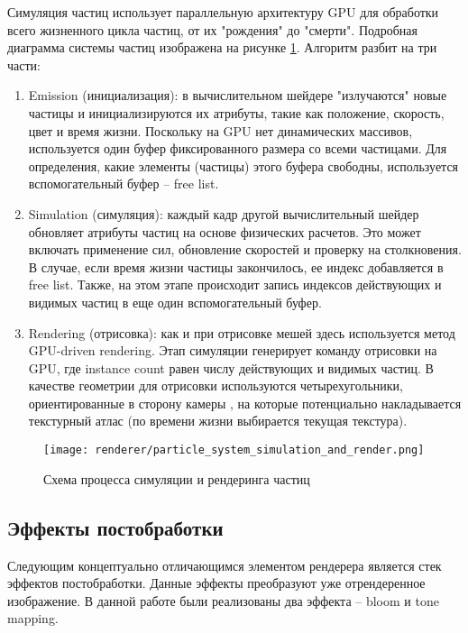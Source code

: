 Симуляция частиц использует параллельную архитектуру GPU для обработки всего жизненного цикла частиц, от их "рождения" до "смерти". Подробная диаграмма системы частиц изображена на рисунке \ref{fig:particle_system_simulation_and_render}. Алгоритм разбит на три части:
\begin{enumerate}
    \item Emission (инициализация): в вычислительном шейдере "излучаются" новые частицы и инициализируются их атрибуты, такие как положение, скорость, цвет и время жизни. Поскольку на GPU нет динамических массивов, используется один буфер фиксированного размера со всеми частицами. Для определения, какие элементы (частицы) этого буфера свободны, используется вспомогательный буфер -- free list.
    \item Simulation (симуляция): каждый кадр другой вычислительный шейдер обновляет атрибуты частиц на основе физических расчетов. Это может включать применение сил, обновление скоростей и проверку на столкновения. В случае, если время жизни частицы закончилось, ее индекс добавляется в free list. Также, на этом этапе происходит запись индексов действующих и видимых частиц в еще один вспомогательный буфер.
    \item Rendering (отрисовка): как и при отрисовке мешей здесь используется метод GPU-driven rendering. Этап симуляции генерирует команду отрисовки на GPU, где instance count равен числу действующих и видимых частиц. В качестве геометрии для отрисовки используются четырехугольники, ориентированные в сторону камеры \cite{schaufler1995dynamically}, на которые потенциально накладывается текстурный атлас (по времени жизни выбирается текущая текстура).
\end{enumerate}

\begin{figure}[h]
    \centering
    \texttt{[image: renderer/particle\_system\_simulation\_and\_render.png]}
    \caption{Схема процесса симуляции и рендеринга частиц}
    \label{fig:particle_system_simulation_and_render}
\end{figure}

\subsection{Эффекты постобработки}
Следующим концептуально отличающимся элементом рендерера является стек эффектов постобработки. Данные эффекты преобразуют уже отрендеренное изображение. В данной работе были реализованы два эффекта -- bloom и tone mapping.

